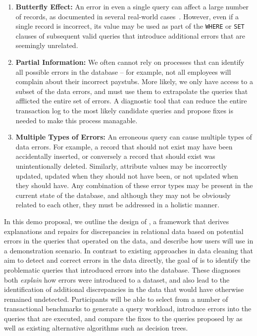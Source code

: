 \begin{enumerate}
\item {\bf Butterfly Effect: } 
An error in even a single query can affect a large number of records, as documented in several real-world
cases~\cite{Yates10, Grady13, sakalerrors}.  However, even if a single record is incorrect,
its value may be used as part of the \texttt{WHERE} or \texttt{SET} clauses of 
subsequent valid queries that introduce additional errors that are seemingly unrelated.

\item {\bf Partial Information:}  We often cannot rely on processes that can identify all possible
errors in the database -- for example, not all employees will complain about their incorrect paystubs.  
More likely, we only have access to a subset of the data errors, and must use them to extrapolate 
the queries that afflicted the entire set of errors.  A diagnostic tool that can reduce
the entire transaction log to the most likely candidate queries and propose fixes
is needed to make this process managable.


\item {\bf Multiple Types of Errors:} 
An erroneous query can cause multiple types of data errors.  For example, a record that should not exist may have been accidentally inserted, or conversely a record that 
should exist was unintentionally deleted.  Similarly, attribute values may be incorrectly updated,
updated when they should not have been, or not updated when they should have.  
Any combination of these error types may be present in the current state of the database,
and although they may not be obviously related to each other, they must be addressed in a holistic manner.  

\end{enumerate}


In this demo proposal, we outline the design of \sys, a framework that derives explanations
and repairs for discrepancies in relational data based on potential errors in
the queries that operated on the data, and describe how users will use \sys
in a demonstration scenario. 
In contrast to existing approaches in data
cleaning that aim to detect and correct errors in the data directly, the goal
of \sys is to identify  the problematic queries that introduced errors into the
database. These diagnoses both \emph{explain} how errors were introduced to a
dataset, and also lead to the identification of additional discrepancies in
the data that would have otherwise remained undetected.
Participants will be able to 
select from a number of transactional benchmarks to generate a query workload,
introduce errors into the queries that are executed,
and compare the fixes to the queries proposed by \sys as well as existing alternative algorithms such as decision trees.



